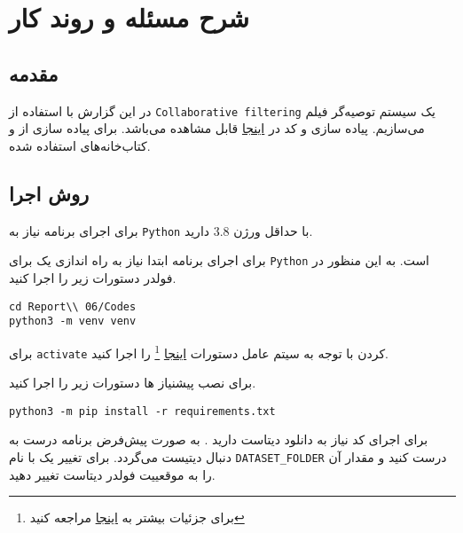 \chapter{شرح مسئله و روند کار}

\section{مقدمه}

در این گزارش با استفاده از
\verb;Collaborative filtering;
یک
سیستم توصیه‌گر فیلم
می‌سازیم.
پیاده سازی و کد در
\href{https://github.com/atrin-hojjat/Uni-AI-Course-Reports/blob/main/Report\%2006/}{اینجا}
قابل مشاهده می‌باشد.
برای پیاده سازی
از
و کتاب‌خانه‌های
استفاده شده.

\section{روش اجرا}
برای اجرای برنامه نیاز به 
\verb;Python;
با حداقل ورژن 
$3.8$
دارید.

برای اجرای برنامه ابتدا نیاز به راه اندازی یک
برای 
\verb;Python;
است.
به این منظور در فولدر
دستورات زیر را اجرا کنید.

\lstset{language=bash}
\begin{latin}
\begin{lstlisting}
cd Report\\ 06/Codes
python3 -m venv venv
\end{lstlisting}
\end{latin}

برای 
\verb;activate;
کردن با توجه به سیتم عامل دستورات
\href{https://packaging.python.org/guides/installing-using-pip-and-virtual-environments/}{اینجا}
\footnote{برای جزئیات بیشتر به 
\href{https://docs.python.org/3/library/venv.html}{اینجا}
 مراجعه کنید
 }
را اجرا کنید.

برای نصب پیشنیاز ها دستورات زیر را اجرا کنید.

\begin{latin}
\begin{lstlisting}
python3 -m pip install -r requirements.txt
\end{lstlisting}
\end{latin}


برای اجرای کد نیاز به دانلود‌ دیتا‌ست دارید
\cite{10.1145/2827872}
.
به صورت پیش‌فرض برنامه درست
به دنبال دیتیست می‌گردد. برای تغییر یک
با نام
\verb;DATASET_FOLDER;
درست کنید و مقدار آن را به موقعییت فولدر دیتاست تغییر دهید.

